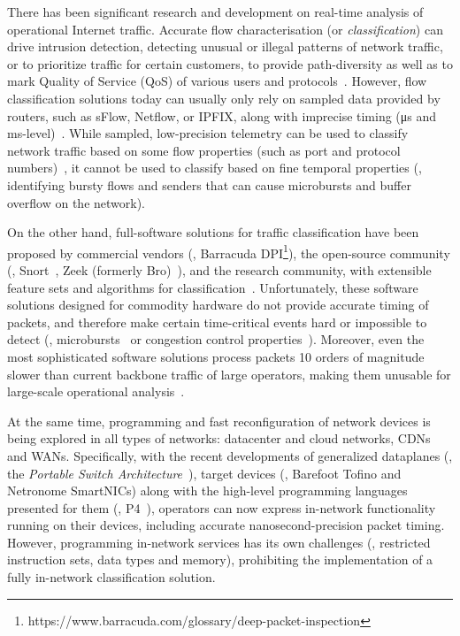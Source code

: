 
There has been significant research and development on real-time analysis of operational Internet traffic.
Accurate flow characterisation (or \emph{classification}) can drive intrusion detection, detecting unusual or illegal patterns of network traffic, or to prioritize traffic for certain customers, to provide path-diversity as well as to mark Quality of Service (QoS) of various users and protocols~\cite{bernaille2006traffic,roesch1999snort}.
However, flow classification solutions today can usually only rely on sampled data provided by routers, such as sFlow, Netflow, or IPFIX, along with imprecise timing (\si{\micro\second} and \si{\milli\second}-level)~\cite{claise2005ipfix,claise2004cisco}.
While sampled, low-precision telemetry can be used to classify network traffic based on some flow properties (such as port and protocol numbers)~\cite{rossi2010fine}, it cannot be used to classify based on fine temporal properties (\eg, identifying bursty flows and senders that can cause microbursts and buffer overflow on the network).

On the other hand, full-software solutions for traffic classification have been proposed by commercial vendors (\eg, Barracuda DPI\footnote{https://www.barracuda.com/glossary/deep-packet-inspection}), the open-source community (\eg, Snort~\cite{roesch1999snort}, Zeek (formerly Bro)~\cite{paxson2006bro}), and the research community, with extensible feature sets and algorithms for classification~\cite{DBLP:conf/icccn/HagosEYK18}.
Unfortunately, these software solutions designed for commodity hardware do not provide accurate timing of packets, and therefore make certain time-critical events hard or impossible to detect (\eg, microbursts~\cite{DBLP:conf/sigcomm/ChenFKRR18} or congestion control properties~\cite{DBLP:conf/icccn/HagosEYK18}).
Moreover, even the most sophisticated software solutions process packets 10 orders of magnitude slower than current backbone traffic of large operators, making them unusable for large-scale operational analysis~\cite{park2017performance}.

At the same time, programming and fast reconfiguration of network devices is being explored in all types of networks: datacenter and cloud networks, CDNs and WANs.
Specifically, with the recent developments of generalized dataplanes (\eg, the \emph{Portable Switch Architecture}~\cite{p4-psa}), target devices (\eg, Barefoot Tofino and Netronome SmartNICs) along with the high-level programming languages presented for them (\eg, P4~\cite{DBLP:journals/ccr/BosshartDGIMRSTVVW14}), operators can now express in-network functionality running on their devices, including accurate nanosecond-precision packet timing.
However, programming in-network services has its own challenges (\eg, restricted instruction sets, data types and memory), prohibiting the implementation of a fully in-network classification solution.

